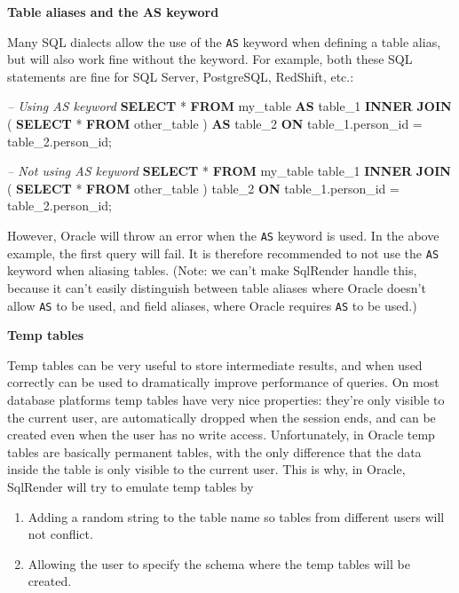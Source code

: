 \documentclass[]{book}
\newenvironment{Shaded}{\begin{snugshade}}{\end{snugshade}}
\newcommand{\KeywordTok}[1]{\textcolor[rgb]{0.13,0.29,0.53}{\textbf{#1}}}
\newcommand{\DecValTok}[1]{\textcolor[rgb]{0.00,0.00,0.81}{#1}}
\newcommand{\CommentTok}[1]{\textcolor[rgb]{0.56,0.35,0.01}{\textit{#1}}}
\newcommand{\NormalTok}[1]{#1}
\providecommand{\tightlist}{%
  \setlength{\itemsep}{0pt}\setlength{\parskip}{0pt}}
\begin{document}
\textbf{Table aliases and the AS keyword}

Many SQL dialects allow the use of the \texttt{AS} keyword when defining
a table alias, but will also work fine without the keyword. For example,
both these SQL statements are fine for SQL Server, PostgreSQL, RedShift,
etc.:

\begin{Shaded}
\begin{Highlighting}[]
\CommentTok{-- Using AS keyword}
\KeywordTok{SELECT}\NormalTok{ * }
\KeywordTok{FROM}\NormalTok{ my_table }\KeywordTok{AS}\NormalTok{ table_}\DecValTok{1}
\KeywordTok{INNER} \KeywordTok{JOIN}\NormalTok{ (}
  \KeywordTok{SELECT}\NormalTok{ * }\KeywordTok{FROM}\NormalTok{ other_table}
\NormalTok{) }\KeywordTok{AS}\NormalTok{ table_}\DecValTok{2}
\KeywordTok{ON}\NormalTok{ table_1.person_id = table_2.person_id;}

\CommentTok{-- Not using AS keyword}
\KeywordTok{SELECT}\NormalTok{ * }
\KeywordTok{FROM}\NormalTok{ my_table table_}\DecValTok{1}
\KeywordTok{INNER} \KeywordTok{JOIN}\NormalTok{ (}
  \KeywordTok{SELECT}\NormalTok{ * }\KeywordTok{FROM}\NormalTok{ other_table}
\NormalTok{) table_}\DecValTok{2}
\KeywordTok{ON}\NormalTok{ table_1.person_id = table_2.person_id;}
\end{Highlighting}
\end{Shaded}

However, Oracle will throw an error when the \texttt{AS} keyword is
used. In the above example, the first query will fail. It is therefore
recommended to not use the \texttt{AS} keyword when aliasing tables.
(Note: we can't make SqlRender handle this, because it can't easily
distinguish between table aliases where Oracle doesn't allow \texttt{AS}
to be used, and field aliases, where Oracle requires \texttt{AS} to be
used.)

\textbf{Temp tables}

Temp tables can be very useful to store intermediate results, and when
used correctly can be used to dramatically improve performance of
queries. On most database platforms temp tables have very nice
properties: they're only visible to the current user, are automatically
dropped when the session ends, and can be created even when the user has
no write access. Unfortunately, in Oracle temp tables are basically
permanent tables, with the only difference that the data inside the
table is only visible to the current user. This is why, in Oracle,
SqlRender will try to emulate temp tables by

\begin{enumerate}
\def\labelenumi{\arabic{enumi}.}
\tightlist
\item
  Adding a random string to the table name so tables from different
  users will not conflict.
\item
  Allowing the user to specify the schema where the temp tables will be
  created.
\end{enumerate}
\end{document}
